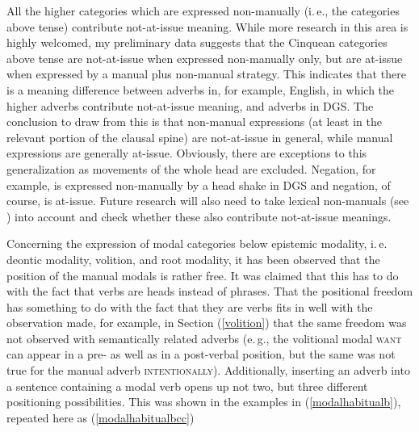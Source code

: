 All the higher categories which are expressed non-manually (i.\,e., the categories above tense) contribute not-at-issue meaning. While more research in this area is highly welcomed, my preliminary data suggests that the Cinquean categories above tense are not-at-issue when expressed non-manually only, but are at-issue when expressed by a manual plus non-manual strategy. This indicates that there is a meaning difference between adverbs in, for example, English, in which the higher adverbs contribute not-at-issue meaning, and adverbs in DGS. The conclusion to draw from this is that non-manual expressions (at least in the relevant portion of the clausal spine) are not-at-issue in general, while manual expressions are generally at-issue. Obviously, there are exceptions to this generalization as movements of the whole head are excluded. Negation, for example, is expressed non-manually by a head shake in DGS and negation, of course, is at-issue. Future research will also need to take lexical non-manuals (see \citealt{pendzich2017lexicalnmms}) into account and check whether these also contribute not-at-issue meanings.

\begin{exe}
\ex \label{ex:lowercpv}
\end{exe}

Concerning the expression of modal categories below epistemic modality, i.\,e. deontic modality, volition, and root modality, it has been observed that the position of the manual modals is rather free. It was claimed that this has to do with the fact that verbs are heads instead of phrases. That the positional freedom has something to do with the fact that they are verbs fits in well with the observation made, for example, in Section (\ref{volition}) that the same freedom was not observed with semantically related adverbs (e.\,g., the volitional modal \textsc{want} can appear in a pre- as well as in a post-verbal position, but the same was not true for the manual adverb \textsc{intentionally}). Additionally, inserting an adverb into a sentence containing a modal verb opens up not two, but three different positioning possibilities. This was shown in the examples in (\ref{modalhabitualb}), repeated here as (\ref{modalhabitualbcc})

